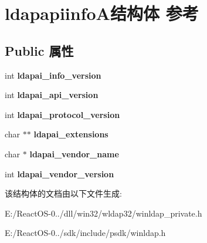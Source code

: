 \hypertarget{structldapapiinfo_a}{}\section{ldapapiinfo\+A结构体 参考}
\label{structldapapiinfo_a}
\subsection*{Public 属性}
\begin{DoxyCompactItemize}
\item 
\mbox{\label{structldapapiinfo_a_acf7c7d5fd752b1e154d6ed8ec7e0f5b8}} 
int {\bfseries ldapai\+\_\+info\+\_\+version}
\item 
\mbox{\label{structldapapiinfo_a_a9e9639d1206745c48e2d0152925acadc}} 
int {\bfseries ldapai\+\_\+api\+\_\+version}
\item 
\mbox{\label{structldapapiinfo_a_ac1d6d8e2f84a556edbb5152f38292678}} 
int {\bfseries ldapai\+\_\+protocol\+\_\+version}
\item 
\mbox{\label{structldapapiinfo_a_ab9609256a3d4758a61261372559fd8ba}} 
char $\ast$$\ast$ {\bfseries ldapai\+\_\+extensions}
\item 
\mbox{\label{structldapapiinfo_a_aba7dfc287d1f749d99da772f639fedb5}} 
char $\ast$ {\bfseries ldapai\+\_\+vendor\+\_\+name}
\item 
\mbox{\label{structldapapiinfo_a_af951173200fce560232b95bd972d5e4f}} 
int {\bfseries ldapai\+\_\+vendor\+\_\+version}
\end{DoxyCompactItemize}


该结构体的文档由以下文件生成\+:\begin{DoxyCompactItemize}
\item 
E\+:/\+React\+O\+S-\/0../dll/win32/wldap32/winldap\+\_\+private.\+h\item 
E\+:/\+React\+O\+S-\/0../sdk/include/psdk/winldap.\+h\end{DoxyCompactItemize}
